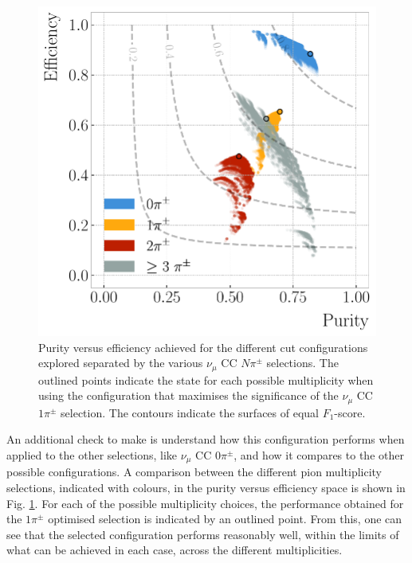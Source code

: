 \begin{figure}[t]
    \centering
    \includegraphics[width=.70\linewidth]{Images/GAr_selection/pion_selection_all_in_one_purity_vs_efficiency.pdf}
    \caption[Purity versus efficiency achieved for the different cut configurations explored separated by the various $\nu_{\mu}$ CC $N\pi^{\pm}$ selections.]{Purity versus efficiency achieved for the different cut configurations explored separated by the various $\nu_{\mu}$ CC $N\pi^{\pm}$ selections. The outlined points indicate the state for each possible multiplicity when using the configuration that maximises the significance of the $\nu_{\mu}$ CC $1\pi^{\pm}$ selection. The contours indicate the surfaces of equal $F_{1}$-score.}
    \label{fig:pion_purity_vs_efficiency}
\end{figure}

An additional check to make is understand how this configuration performs when applied to the other selections, like $\nu_{\mu}$ CC $0\pi^{\pm}$, and how it compares to the other possible configurations. A comparison between the different pion multiplicity selections, indicated with colours, in the purity versus efficiency space is shown in Fig. \ref{fig:pion_purity_vs_efficiency}. For each of the possible multiplicity choices, the performance obtained for the $1\pi^{\pm}$ optimised selection is indicated by an outlined point. From this, one can see that the selected configuration performs reasonably well, within the limits of what can be achieved in each case, across the different multiplicities.

